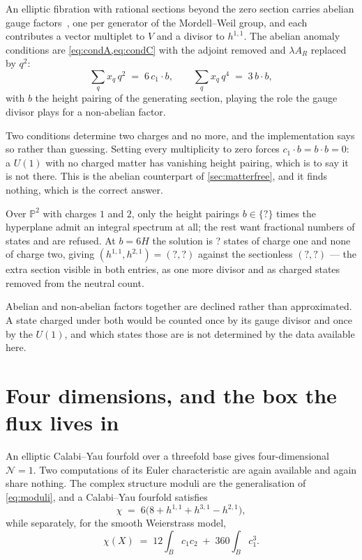\documentclass[11pt,a4paper]{article}
\newcommand{\SFPTwoHone}{?}\newcommand{\SFPTwoHtwo}{?}
\newcommand{\SFMWCharge}{?}\newcommand{\SFMWHone}{?}
\newcommand{\SFMWHtwo}{?}\newcommand{\SFMWGood}{?}
\newcommand{\PP}{\mathbb{P}}
\theoremstyle{definition}
\begin{document}
An elliptic fibration with rational sections beyond the zero section carries
abelian gauge factors~\cite{MorrisonPark2012}, one per generator of the
Mordell--Weil group, and each contributes a vector multiplet to $V$ and a
divisor to $h^{1,1}$. The abelian anomaly conditions are
\cref{eq:condA,eq:condC} with the adjoint removed and $\lambda A_R$ replaced
by $q^2$:
%
\begin{equation}
\sum_q x_q\, q^2 \;=\; 6\, c_1 \cdot b ,
\qquad
\sum_q x_q\, q^4 \;=\; 3\, b \cdot b ,
\label{eq:abelian}
\end{equation}
%
with $b$ the height pairing of the generating section, playing the role the
gauge divisor plays for a non-abelian factor.

Two conditions determine two charges and no more, and the implementation says
so rather than guessing. Setting every multiplicity to zero forces
$c_1 \cdot b = b \cdot b = 0$: a $U(1)$ with no charged matter has vanishing
height pairing, which is to say it is not there. This is the abelian
counterpart of \cref{sec:matterfree}, and it finds nothing, which is the
correct answer.

Over $\PP^2$ with charges $1$ and $2$, only the height pairings
$b \in \{\SFMWGood\}$ times the hyperplane admit an integral spectrum at all;
the rest want fractional numbers of states and are refused. At $b = 6H$ the
solution is \SFMWCharge{} states of charge one and none of charge two, giving
$(h^{1,1}, h^{2,1}) = (\SFMWHone, \SFMWHtwo)$ against the sectionless
$(\SFPTwoHone, \SFPTwoHtwo)$ --- the extra section visible in both entries, as
one more divisor and as charged states removed from the neutral count.

Abelian and non-abelian factors together are declined rather than
approximated. A state charged under both would be counted once by its gauge
divisor and once by the $U(1)$, and which states those are is not determined
by the data available here.


\section{Four dimensions, and the box the flux lives in}
\label{sec:four}

An elliptic Calabi--Yau fourfold over a threefold base gives four-dimensional
$\mathcal{N}=1$. Two computations of its Euler characteristic are again
available and again share nothing. The complex structure moduli are the
generalisation of \cref{eq:moduli}, and a Calabi--Yau fourfold
satisfies~\cite{KLRY1998}
%
\begin{equation}
\chi \;=\; 6\bigl(8 + h^{1,1} + h^{3,1} - h^{2,1}\bigr) ,
\label{eq:chifour}
\end{equation}
%
while separately, for the smooth Weierstrass model,
%
\begin{equation}
\chi(X) \;=\; 12 \int_B c_1 c_2 \;+\; 360 \int_B c_1^3 .
\label{eq:chifourchern}
\end{equation}
\end{document}
